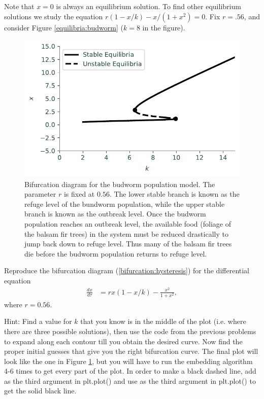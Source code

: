 Note that $x = 0$ is always an equilibrium solution.
To find other equilibrium solutions we study the equation $r(1-x/k)-x/(1+x^2) = 0$.
Fix $r = .56$, and consider Figure \eqref{equilibria:budworm} ($k=8$ in the figure).

\newpage
\begin{figure}
\centering
\includegraphics[width=\textwidth]{figures/BudwormPopulation.pdf}
\caption{Bifurcation diagram for the budworm population model.
The parameter $r$ is fixed at $0.56.$
The lower stable branch is known as the refuge level of the bundworm population, while the upper stable branch is known as the outbreak level.
Once the budworm population reaches an outbreak level, the available food (foliage of the balsam fir trees) in the system must be reduced drastically to jump back down to refuge level.
Thus many of the balsam fir trees die before the budworm population returns to refuge level.}
\label{bifurcation:budworm}
\end{figure}

\newpage
\begin{problem} %
Reproduce the bifurcation diagram (\ref{bifurcation:hysteresis}) for the differential equation
\begin{align*}
	\frac{dx}{d \tau} &= rx(1-x/k) - \frac{x^2}{1+x^2},
\end{align*}
where $r = 0.56$.

Hint: Find a value for $k$ that you know is in the middle of the plot (i.e. where there are three possible solutions), then use the code from the previous problems to expand along each contour till you obtain the desired curve.
Now find the proper initial guesses that give you the right bifurcation curve.
The final plot will look like the one in Figure \ref{bifurcation:budworm}, but you will have to run the embedding algorithm 4-6 times to get every part of the plot. In order to make a black dashed line, add  as the third argument in plt.plot() and use  as the third argument in plt.plot() to get the solid black line.
\end{problem} 

